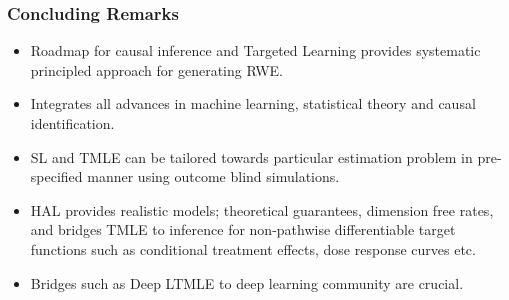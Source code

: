 \documentclass[t]{beamer}
\begin{document}

\begin{frame}\frametitle{Concluding Remarks}
\begin{itemize}
\item Roadmap for causal inference and Targeted Learning provides systematic principled approach for generating RWE.
\item Integrates all advances in machine learning, statistical theory and causal identification.
\item SL and TMLE can be tailored towards particular estimation problem in pre-specified manner using outcome blind simulations.
\item HAL provides realistic models;  theoretical guarantees, dimension free rates,  and bridges TMLE to inference for non-pathwise differentiable target functions such as conditional treatment effects, dose response curves etc.
\item Bridges such as Deep LTMLE to deep learning community are crucial.
\end{itemize}
\end{frame}
\end{document}

